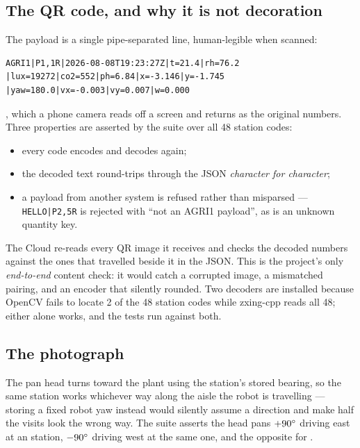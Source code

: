 \subsection{The QR code, and why it is not decoration}

The payload is a single pipe-separated line, human-legible when scanned:

\begin{lstlisting}[style=bash]
AGRI1|P1,1R|2026-08-08T19:23:27Z|t=21.4|rh=76.2
|lux=19272|co2=552|ph=6.84|x=-3.146|y=-1.745
|yaw=180.0|vx=-0.003|vy=0.007|w=0.000
\end{lstlisting}

, which a phone camera reads off a screen and
returns as the original numbers. Three properties are asserted by the
suite over all 48 station codes:

\begin{itemize}[leftmargin=*,itemsep=1pt,topsep=2pt]
  \item every code encodes and decodes again;
  \item the decoded text round-trips through the JSON
        \emph{character for character};
  \item a payload from another system is refused rather than
        misparsed --- \texttt{HELLO|P2,5R} is rejected with
        ``not an AGRI1 payload'', as is an unknown quantity key.
\end{itemize}

The Cloud re-reads every QR image it receives and checks the decoded
numbers against the ones that travelled beside it in the JSON. This is
the project's only \emph{end-to-end} content check: it would catch a
corrupted image, a mismatched pairing, and an encoder that silently
rounded. Two decoders are installed because OpenCV fails to locate 2 of
the 48 station codes while zxing-cpp reads all 48; either alone works,
and the tests run against both.

\subsection{The photograph}

The pan head turns toward the plant using the station's stored bearing,
so the same station works whichever way along the aisle the robot is
travelling --- storing a fixed robot yaw instead would silently assume a
direction and make half the visits look the wrong way. The suite asserts
the head pans $+90^\circ$ driving east at an  station,
$-90^\circ$ driving west at the same one, and the opposite for
.

